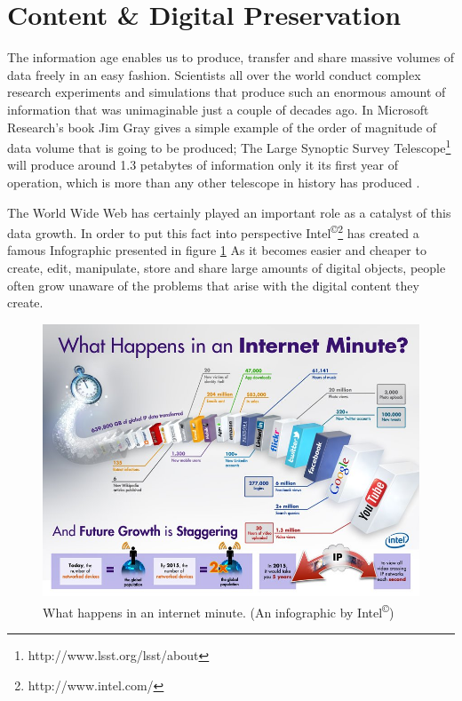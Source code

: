 \section{Content \& Digital Preservation}
The information age enables us to produce, transfer and share massive volumes of data freely in an easy fashion. Scientists all over the world conduct complex research experiments and simulations that produce such an enormous amount of information that was unimaginable just a couple of decades ago. In Microsoft Research's book Jim Gray gives a simple example of the order of magnitude of data volume that is going to be produced; The Large Synoptic Survey Telescope\footnote{http://www.lsst.org/lsst/about} will produce around 1.3 petabytes of information only it its first year of operation, which is more than any other telescope in history has produced \cite{Gray:2009:fourthparadigm}.

The World Wide Web has certainly played an important role as a catalyst of this data growth. In order to put this fact into perspective Intel\textsuperscript{\copyright}\footnote{http://www.intel.com/} has created a famous Infographic presented in figure \ref{fig:intel_oneminute_internet}
As it becomes easier and cheaper to create, edit, manipulate, store and share large amounts of digital objects, people often grow unaware of the problems that arise with the digital content they create.

\begin{figure}[htb]
\begin{center}
\includegraphics[width=6in]{figures/introduction/intel_oneminute_internet.jpg}
\caption{What happens in an internet minute. (An infographic by Intel\textsuperscript{\copyright})}
\label{fig:intel_oneminute_internet}
\end{center}
\end{figure}

